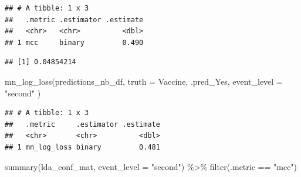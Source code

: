\documentclass[
]{article}
\newenvironment{Shaded}{\begin{snugshade}}{\end{snugshade}}
\newcommand{\AttributeTok}[1]{\textcolor[rgb]{0.77,0.63,0.00}{#1}}
\newcommand{\DecValTok}[1]{\textcolor[rgb]{0.00,0.00,0.81}{#1}}
\newcommand{\FunctionTok}[1]{\textcolor[rgb]{0.00,0.00,0.00}{#1}}
\newcommand{\NormalTok}[1]{#1}
\newcommand{\OtherTok}[1]{\textcolor[rgb]{0.56,0.35,0.01}{#1}}
\newcommand{\SpecialCharTok}[1]{\textcolor[rgb]{0.00,0.00,0.00}{#1}}
\newcommand{\StringTok}[1]{\textcolor[rgb]{0.31,0.60,0.02}{#1}}
\begin{document}
\begin{verbatim}
## # A tibble: 1 x 3
##   .metric .estimator .estimate
##   <chr>   <chr>          <dbl>
## 1 mcc     binary         0.490
\end{verbatim}

\begin{Shaded}
\end{Shaded}

\begin{verbatim}
## [1] 0.04854214
\end{verbatim}

\begin{Shaded}
\begin{Highlighting}[]
\FunctionTok{mn\_log\_loss}\NormalTok{(predictions\_nb\_df,}
            \AttributeTok{truth =}\NormalTok{ Vaccine,}
\NormalTok{            .pred\_Yes,}
            \AttributeTok{event\_level =} \StringTok{"second"}
\NormalTok{)}
\end{Highlighting}
\end{Shaded}

\begin{verbatim}
## # A tibble: 1 x 3
##   .metric     .estimator .estimate
##   <chr>       <chr>          <dbl>
## 1 mn_log_loss binary         0.481
\end{verbatim}

\begin{Shaded}
\begin{Highlighting}[]
\FunctionTok{summary}\NormalTok{(lda\_conf\_mat, }\AttributeTok{event\_level =} \StringTok{"second"}\NormalTok{) }\SpecialCharTok{\%\textgreater{}\%} \FunctionTok{filter}\NormalTok{(.metric }\SpecialCharTok{==} \StringTok{"mcc"}\NormalTok{)}
\end{Highlighting}
\end{Shaded}
\end{document}
